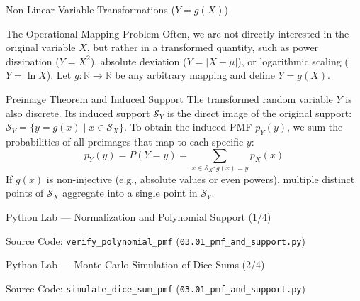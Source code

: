 \documentclass[10pt, aspectratio=169]{beamer}
\begin{document}
\begin{frame}{Non-Linear Variable Transformations ($Y=g(X)$)}
  \fontsize{7.5pt}{9pt}\selectfont
  \begin{block}{The Operational Mapping Problem}
    \fontsize{7.5pt}{9pt}\selectfont
    Often, we are not directly interested in the original variable $X$, but rather in a transformed quantity, such as power dissipation ($Y = X^2$), absolute deviation ($Y = |X - \mu|$), or logarithmic scaling ($Y = \ln X$). Let $g: \mathbb{R} \to \mathbb{R}$ be any arbitrary mapping and define $Y = g(X)$.
  \end{block}
  \vspace{-0.15cm}
  \pause
  \begin{alertblock}{Preimage Theorem and Induced Support}
    \fontsize{7.5pt}{9pt}\selectfont
    The transformed random variable $Y$ is also discrete. Its induced support $\mathcal{S}_Y$ is the direct image of the original support: $\mathcal{S}_Y = \{y = g(x) \mid x \in \mathcal{S}_X\}$. To obtain the induced PMF $p_Y(y)$, we sum the probabilities of all preimages that map to each specific $y$:
    $$p_Y(y) = P(Y = y) = \sum_{x \in \mathcal{S}_X: g(x) = y} p_X(x)$$
    If $g(x)$ is non-injective (e.g., absolute values or even powers), multiple distinct points of $\mathcal{S}_X$ aggregate into a single point in $\mathcal{S}_Y$.
  \end{alertblock}
\end{frame}

\begin{frame}[fragile]{Python Lab — Normalization and Polynomial Support (1/4)}
  \begin{block}{Source Code: \texttt{verify\_polynomial\_pmf} (\texttt{03.01\_pmf\_and\_support.py})}
    \fontsize{6pt}{7pt}\selectfont
    
  \end{block}
\end{frame}

\begin{frame}[fragile]{Python Lab — Monte Carlo Simulation of Dice Sums (2/4)}
  \begin{block}{Source Code: \texttt{simulate\_dice\_sum\_pmf} (\texttt{03.01\_pmf\_and\_support.py})}
    \fontsize{6pt}{7pt}\selectfont
    
  \end{block}
\end{frame}
\end{document}
